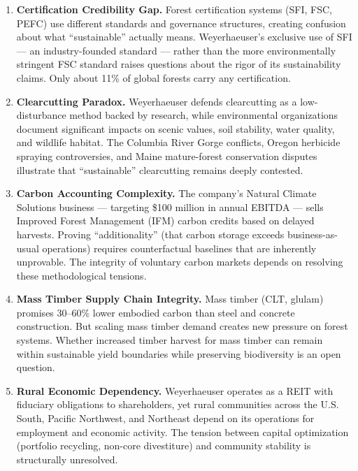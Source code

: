 \documentclass[11pt,letterpaper]{article}
\begin{document}
\begin{enumerate}[leftmargin=2em]
\item \textbf{Certification Credibility Gap.} Forest certification systems (SFI, FSC, PEFC) use different standards and governance structures, creating confusion about what ``sustainable'' actually means. Weyerhaeuser's exclusive use of SFI --- an industry-founded standard --- rather than the more environmentally stringent FSC standard raises questions about the rigor of its sustainability claims. Only about 11\% of global forests carry any certification.

\item \textbf{Clearcutting Paradox.} Weyerhaeuser defends clearcutting as a low-disturbance method backed by research, while environmental organizations document significant impacts on scenic values, soil stability, water quality, and wildlife habitat. The Columbia River Gorge conflicts, Oregon herbicide spraying controversies, and Maine mature-forest conservation disputes illustrate that ``sustainable'' clearcutting remains deeply contested.

\item \textbf{Carbon Accounting Complexity.} The company's Natural Climate Solutions business --- targeting \$100 million in annual EBITDA --- sells Improved Forest Management (IFM) carbon credits based on delayed harvests. Proving ``additionality'' (that carbon storage exceeds business-as-usual operations) requires counterfactual baselines that are inherently unprovable. The integrity of voluntary carbon markets depends on resolving these methodological tensions.

\item \textbf{Mass Timber Supply Chain Integrity.} Mass timber (CLT, glulam) promises 30--60\% lower embodied carbon than steel and concrete construction. But scaling mass timber demand creates new pressure on forest systems. Whether increased timber harvest for mass timber can remain within sustainable yield boundaries while preserving biodiversity is an open question.

\item \textbf{Rural Economic Dependency.} Weyerhaeuser operates as a REIT with fiduciary obligations to shareholders, yet rural communities across the U.S. South, Pacific Northwest, and Northeast depend on its operations for employment and economic activity. The tension between capital optimization (portfolio recycling, non-core divestiture) and community stability is structurally unresolved.
\end{enumerate}
\end{document}
